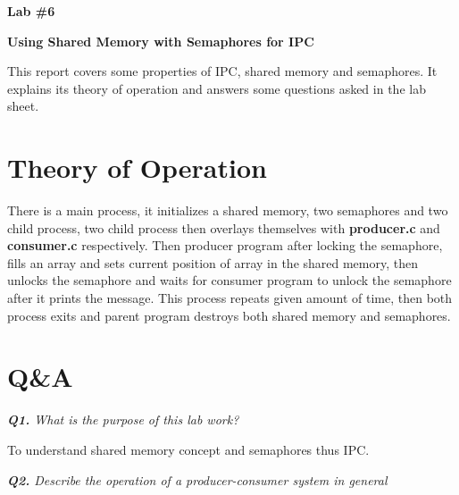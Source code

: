 \documentclass[11pt]{article}
\makeatletter
\renewenvironment{titlepage}
    {%
      \cleardoublepage
      \if@twocolumn
        \@restonecoltrue\onecolumn
      \else
        \@restonecolfalse\newpage
      \fi
      \thispagestyle{empty}%
    }%
    {\if@restonecol\twocolumn \else \newpage \fi
    }
\renewenvironment{titlepage}
    {%
      \cleardoublepage
      \if@twocolumn
        \@restonecoltrue\onecolumn
      \else
        \@restonecolfalse\newpage
      \fi
      \thispagestyle{empty}%
    }%
    {\if@restonecol\twocolumn \else \newpage \fi
     \if@twoside\else
     \fi
    }
\makeatother
\begin{document}
\begin{titlepage}
   \begin{center}
       \vspace*{5cm}
 
       \textbf{ \LARGE Lab \#6}
       
       \vspace{0.5cm}
 	\textbf{Using Shared Memory with Semaphores for IPC}
 	
       \vspace{0.5cm}

This report covers some properties of IPC, shared memory and semaphores. It explains its theory of operation and answers some questions asked in the lab sheet.
 
   \end{center}
\end{titlepage}



\section*{Theory of Operation}

There is a main process, it initializes a shared memory, two semaphores and two child process, two child process then overlays themselves with \textbf{producer.c} and \textbf{consumer.c} respectively. Then producer program after locking the semaphore, fills an array and sets current position of array in the shared memory, then unlocks the semaphore and waits for consumer program to unlock the semaphore after it prints the message. This process repeats given amount of time, then both process exits and parent program destroys both shared memory and semaphores.

\section*{Q\&A}

\vspace{3mm}
\textit{\textbf{Q1.} What is the purpose of this lab work?}
\vspace{3mm}

To understand shared memory concept and semaphores thus IPC.

\vspace{3mm}
\textit{\textbf{Q2.} Describe the operation of a producer-consumer system in general }
\vspace{3mm}
\end{document}

